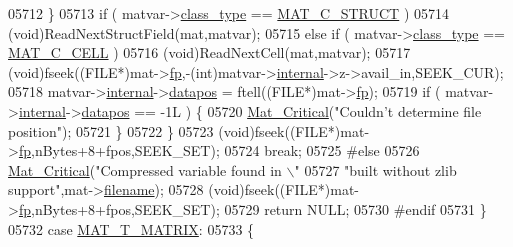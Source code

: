 \begin{DoxyCode}
{{{{{{{{{{{{{{{{{{{{{{{{{{{{{{{{{{05712                 \}
05713                 \textcolor{keywordflow}{if} ( matvar->\hyperlink{group___m_a_t_aff13035bf3265dd7d9425e5d40c839d4}{class\_type} == \hyperlink{group___m_a_t_ggad4d60ae7b709fc81bfd744fb4c857c40acb467c7749c80902b798134c729bb521}{MAT\_C\_STRUCT} )
05714                     (void)ReadNextStructField(mat,matvar);
05715                 \textcolor{keywordflow}{else} \textcolor{keywordflow}{if} ( matvar->\hyperlink{group___m_a_t_aff13035bf3265dd7d9425e5d40c839d4}{class\_type} == \hyperlink{group___m_a_t_ggad4d60ae7b709fc81bfd744fb4c857c40a2f7abb47a1c51e248bd4e5e03cc81b08}{MAT\_C\_CELL} )
05716                     (void)ReadNextCell(mat,matvar);
05717                 (void)fseek((FILE*)mat->\hyperlink{struct__mat__t_a85f562e407ca9ad4d2a6e14f839432b7}{fp},-(int)matvar->\hyperlink{group___m_a_t_a6e97e3ed9f40c49322c18561c2a94e92}{internal}->z->avail\_in,SEEK\_CUR);
05718                 matvar->\hyperlink{group___m_a_t_a6e97e3ed9f40c49322c18561c2a94e92}{internal}->\hyperlink{structmatvar__internal_afd3bfaab126a160bd6855563e1ea0a7e}{datapos} = ftell((FILE*)mat->\hyperlink{struct__mat__t_a85f562e407ca9ad4d2a6e14f839432b7}{fp});
05719                 \textcolor{keywordflow}{if} ( matvar->\hyperlink{group___m_a_t_a6e97e3ed9f40c49322c18561c2a94e92}{internal}->\hyperlink{structmatvar__internal_afd3bfaab126a160bd6855563e1ea0a7e}{datapos} == -1L ) \{
05720                     \hyperlink{group__mat__util_gaf51f2bfbb5580f575e4dd79757e2b80c}{Mat\_Critical}(\textcolor{stringliteral}{"Couldn't determine file position"});
05721                 \}
05722             \}
05723             (void)fseek((FILE*)mat->\hyperlink{struct__mat__t_a85f562e407ca9ad4d2a6e14f839432b7}{fp},nBytes+8+fpos,SEEK\_SET);
05724             \textcolor{keywordflow}{break};
05725 \textcolor{preprocessor}{#else}
05726             \hyperlink{group__mat__util_gaf51f2bfbb5580f575e4dd79757e2b80c}{Mat\_Critical}(\textcolor{stringliteral}{"Compressed variable found in \(\backslash\)"%
05727                          \textcolor{stringliteral}{"built without zlib support"},mat->\hyperlink{struct__mat__t_a340b191598135edd03b6dec847f0b1b1}{filename});
05728             (void)fseek((FILE*)mat->\hyperlink{struct__mat__t_a85f562e407ca9ad4d2a6e14f839432b7}{fp},nBytes+8+fpos,SEEK\_SET);
05729             \textcolor{keywordflow}{return} NULL;
05730 \textcolor{preprocessor}{#endif}
05731         \}
05732         \textcolor{keywordflow}{case} \hyperlink{group___m_a_t_ggacf7b3b879282b7ab3a51190e49bf3453a32985fee89a4df8db4b3f5d3a48823d3}{MAT\_T\_MATRIX}:
05733         \{
}}}}}}}}}}}}}}}}}}}}}}}}}}}}}}}}}}}
\end{DoxyCode}
